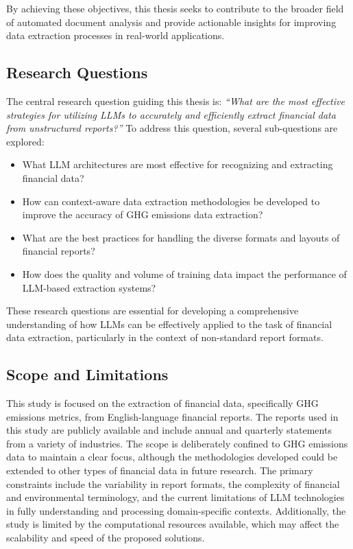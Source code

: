 \documentclass[english, 12pt, a4paper, elec, utf8, a-2b, online]{aaltothesis}
\begin{document}
By achieving these objectives, this thesis seeks to contribute to the broader field of automated document analysis and provide actionable insights for improving data extraction processes in real-world applications.

\subsection{Research Questions}

The central research question guiding this thesis is: \textit{``What are the most effective strategies for utilizing \acp{LLM} to accurately and efficiently extract financial data from unstructured reports?''} To address this question, several sub-questions are explored:
\begin{itemize}
\item What \ac{LLM} architectures are most effective for recognizing and extracting financial data?
\item How can context-aware data extraction methodologies be developed to improve the accuracy of \ac{GHG} emissions data extraction?
\item What are the best practices for handling the diverse formats and layouts of financial reports?
\item How does the quality and volume of training data impact the performance of \ac{LLM}-based extraction systems?
\end{itemize}

These research questions are essential for developing a comprehensive understanding of how \acp{LLM} can be effectively applied to the task of financial data extraction, particularly in the context of non-standard report formats.

\subsection{Scope and Limitations}

This study is focused on the extraction of financial data, specifically \ac{GHG} emissions metrics, from English-language financial reports. The reports used in this study are publicly available and include annual and quarterly statements from a variety of industries. The scope is deliberately confined to \ac{GHG} emissions data to maintain a clear focus, although the methodologies developed could be extended to other types of financial data in future research. The primary constraints include the variability in report formats, the complexity of financial and environmental terminology, and the current limitations of \ac{LLM} technologies in fully understanding and processing domain-specific contexts. Additionally, the study is limited by the computational resources available, which may affect the scalability and speed of the proposed solutions.
\end{document}
